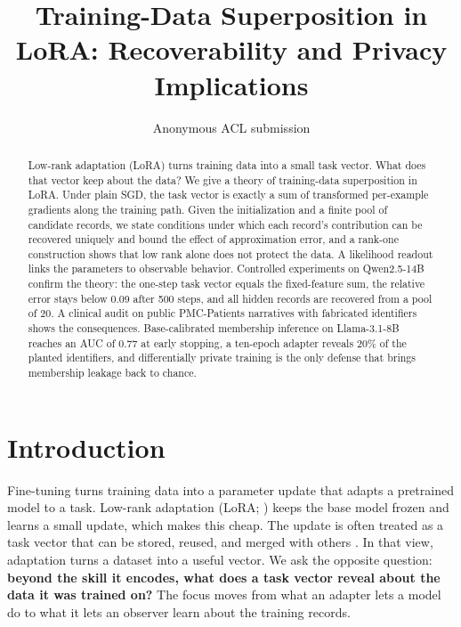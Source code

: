\documentclass[11pt]{article}
\title{Training-Data Superposition in LoRA: Recoverability and Privacy Implications}
\author{Anonymous ACL submission}
\theoremstyle{plain}
\theoremstyle{definition}
\begin{document}
\maketitle

\begin{abstract}
Low-rank adaptation (LoRA) turns training data into a small task vector. What does that vector keep about the data? We give a theory of training-data superposition in LoRA. Under plain SGD, the task vector is exactly a sum of transformed per-example gradients along the training path. Given the initialization and a finite pool of candidate records, we state conditions under which each record's contribution can be recovered uniquely and bound the effect of approximation error, and a rank-one construction shows that low rank alone does not protect the data. A likelihood readout links the parameters to observable behavior. Controlled experiments on Qwen2.5-14B confirm the theory: the one-step task vector equals the fixed-feature sum, the relative error stays below 0.09 after 500 steps, and all hidden records are recovered from a pool of 20. A clinical audit on public PMC-Patients narratives with fabricated identifiers shows the consequences. Base-calibrated membership inference on Llama-3.1-8B reaches an AUC of 0.77 at early stopping, a ten-epoch adapter reveals 20\% of the planted identifiers, and differentially private training is the only defense that brings membership leakage back to chance.
\end{abstract}

\section{Introduction}
\label{sec:introduction}

Fine-tuning turns training data into a parameter update that adapts a pretrained model to a task.
Low-rank adaptation (LoRA; \citealp{hu2022lora}) keeps the base model frozen and learns a small update, which makes this cheap.
The update is often treated as a task vector that can be stored, reused, and merged with others \citep{ilharco2023editing,yadav2023ties,yu2024language}.
In that view, adaptation turns a dataset into a useful vector.
We ask the opposite question: \textbf{beyond the skill it encodes, what does a task vector reveal about the data it was trained on?}
The focus moves from what an adapter lets a model do to what it lets an observer learn about the training records.
\end{document}
